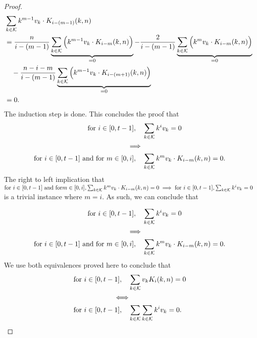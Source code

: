 \begin{proof}
    \begin{equation*}
        \begin{split}
            & \sum_{k \in \mathcal{K}} k^{m-1}v_k \cdot K_{i-(m-1)}(k,n)\\
            &= \frac{n}{i-(m-1)}\underbrace{\sum_{k \in \mathcal{K}} \Big(k^{m-1}v_k\cdot K_{i-m}(k,n) \Big)}_{=0} - \frac{2}{i-(m-1)}\underbrace{\sum_{k \in \mathcal{K}} \Big(k^mv_k\cdot K_{i-m}(k,n)\Big)}_{=0}\\
            &\quad -\frac{n-i-m}{i-(m-1)}\underbrace{\sum_{k \in \mathcal{K}}\Big(k^{m-1}v_k\cdot K_{i-(m+1)}(k,n)\Big)}_{=0}\\
            &= 0.
        \end{split}
    \end{equation*}
    The induction step is done. This concludes the proof that
    \begin{equation*}
        \begin{split}
            \text{for } i \in [0, t-1], \quad &\sum_{k \in \mathcal{K}} k^iv_k = 0\\
            \implies\\
            \text{ for } i \in [0, t-1] \text{ and for } m \in [0, i], \quad &\sum_{k \in \mathcal{K}} k^mv_k\cdot K_{i-m}(k,n) = 0.
        \end{split}
    \end{equation*}
    The right to left implication that $\text{for } i \in [0, t-1] \text{ and for} m \in [0, i], \sum_{k \in \mathcal{K}} k^mv_k \cdot K_{i-m}(k, n) = 0 \implies \text{for } i \in [0, t-1], \sum_{k \in \mathcal{K}} k^iv_k = 0$ is a trivial instance where $m = i$. As such, we can conclude that

    \begin{equation*}
        \begin{split}
            \text{for } i \in [0, t-1], \quad &\sum_{k \in \mathcal{K}} k^iv_k = 0\\
            \implies\\
            \text{ for } i \in [0, t-1] \text{ and for } m \in [0, i], \quad &\sum_{k \in \mathcal{K}} k^mv_k\cdot K_{i-m}(k,n) = 0.
        \end{split}
    \end{equation*}
    We use both equivalences proved here to conclude that
    \begin{equation*}
        \begin{split}
            \text{for } i \in [0, t-1], \quad &\sum_{k \in \mathcal{K}} v_kK_i(k,n) = 0\\
            \Longleftrightarrow\\
            \text{ for } i \in [0, t-1], \quad &\sum_{k \in \mathcal{K}} \sum_{k \in \mathcal{K}} k^iv_k = 0.
        \end{split}
    \end{equation*}
\end{proof}


